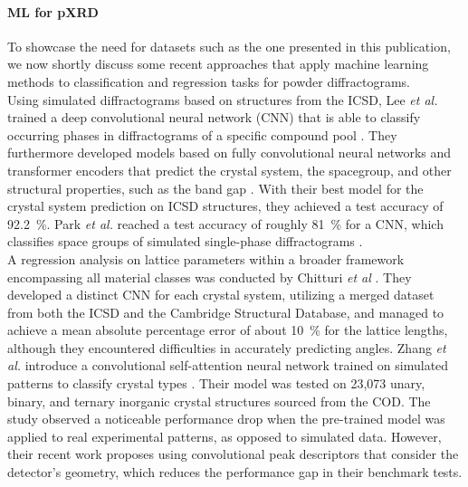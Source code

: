 \paragraph{ML for pXRD}

To showcase the need for datasets such as the one presented in this publication, we now shortly discuss some recent
approaches that apply machine learning methods to classification and regression tasks for powder diffractograms. \\

Using simulated diffractograms based on structures from the ICSD, Lee {\it et al.} trained a deep convolutional neural network (CNN) that is able to classify occurring phases in diffractograms of a specific compound pool \cite{Lee2020}. They furthermore developed models based on fully convolutional neural networks and transformer encoders that predict the crystal system, the spacegroup, and other structural properties, such as the band gap \cite{Lee2022}. With their best model for the crystal system prediction on ICSD structures, they achieved a test accuracy of \SI{92.2}{\percent}. Park {\it et al.} reached a test accuracy of roughly \SI{81}{\percent} for a CNN, which classifies space groups of simulated single-phase diffractograms \cite{Park2017}. \\

A regression analysis on lattice parameters within a broader framework encompassing all material classes was conducted by Chitturi {\it et al} \cite{Chitturi2021}. They developed a distinct CNN for each crystal system, utilizing a merged dataset from both the ICSD and the Cambridge Structural Database, and managed to achieve a mean absolute percentage error of about \SI{10}{\percent} for the lattice lengths, although they encountered difficulties in accurately predicting angles.
Zhang {\it et al.} introduce a convolutional self-attention neural network trained on simulated patterns to classify crystal types \cite{zhang2024crystallographic}. Their model was tested on 23,073 unary, binary, and ternary inorganic crystal structures sourced from the COD. The study observed a noticeable performance drop when the pre-trained model was applied to real experimental patterns, as opposed to simulated data. However, their recent work \cite{cao2024simxrd} proposes using convolutional peak descriptors that consider the detector's geometry, which reduces the performance gap in their benchmark tests.\\

